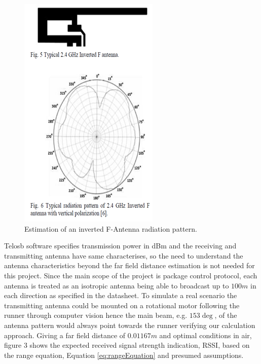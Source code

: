 \begin{figure}[H]
	\centering
	\includegraphics[width=0.8\linewidth]{theory/pathLoss/fig/invertedAntenna.png}
	\caption{Estimation of an inverted F-Antenna radiation pattern.}
	\label{fig:invertedAntenna}
\end{figure}

Telosb software specifies transmission power in dBm and the receiving and transmitting antenna have same characterises, so the need to understand the antenna characteristics beyond the far field distance estimation is not needed for this project. Since the main scope of the project is package control protocol, each antenna is treated as an isotropic antenna being able to broadcast up to $100m$ in each direction as specified in the datasheet. To simulate a real scenario the transmitting antenna could be mounted on a rotational motor following the runner through computer vision hence the main beam, e.g. $153\deg$, of the antenna pattern would always point towards the runner verifying our calculation approach. Giving a far field distance of $0.01167m$ and optimal conditions in air, figure 3 shows the expected received signal strength indication, RSSI, based on the range equation, Equation \ref{eq:rangeEquation} and presumed assumptions.





